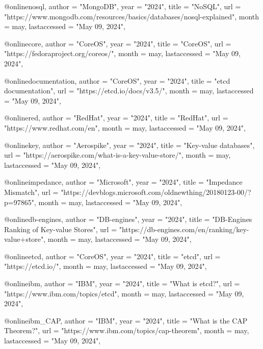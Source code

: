 @online{nosql,
  author =       "MongoDB",
  year =         "2024",
  title =        "NoSQL",
  url =          "https://www.mongodb.com/resources/basics/databases/nosql-explained",
  month =        may,
  lastaccessed = "May 09, 2024",
}

@online{core,
  author =       "CoreOS",
  year =         "2024",
  title =        "CoreOS",
  url =          "https://fedoraproject.org/coreos/",
  month =        may,
  lastaccessed = "May 09, 2024",
}

@online{documentation,
  author =       "CoreOS",
  year =         "2024",
  title =        "etcd documentation",
  url =          "https://etcd.io/docs/v3.5/",
  month =        may,
  lastaccessed = "May 09, 2024",
}

@online{red,
  author =       "RedHat",
  year =         "2024",
  title =        "RedHat",
  url =          "https://www.redhat.com/en",
  month =        may,
  lastaccessed = "May 09, 2024",
}

@online{key,
  author =       "Aerospike",
  year =         "2024",
  title =        "Key-value databases",
  url =          "https://aerospike.com/what-is-a-key-value-store/",
  month =        may,
  lastaccessed = "May 09, 2024",
}

@online{impedance,
  author =       "Microsoft",
  year =         "2024",
  title =        "Impedance Mismatch",
  url =          "https://devblogs.microsoft.com/oldnewthing/20180123-00/?p=97865",
  month =        may,
  lastaccessed = "May 09, 2024",
}

@online{db-engines,
  author =       "DB-engines",
  year =         "2024",
  title =        "DB-Engines Ranking of Key-value Stores",
  url =          "https://db-engines.com/en/ranking/key-value+store",
  month =        may,
  lastaccessed = "May 09, 2024",
}

@online{etcd,
  author =       "CoreOS",
  year =         "2024",
  title =        "etcd",
  url =          "https://etcd.io/",
  month =        may,
  lastaccessed = "May 09, 2024",
}

@online{ibm,
  author =       "IBM",
  year =         "2024",
  title =        "What is etcd?",
  url =          "https://www.ibm.com/topics/etcd",
  month =        may,
  lastaccessed = "May 09, 2024",
}

@online{ibm_CAP,
  author =       "IBM",
  year =         "2024",
  title =        "What is the CAP Theorem?",
  url =          "https://www.ibm.com/topics/cap-theorem",
  month =        may,
  lastaccessed = "May 09, 2024",
}

